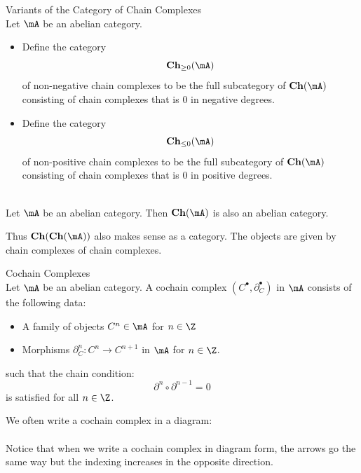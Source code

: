\documentclass[a4paper]{article}
\begin{document}
\begin{defn}{Variants of the Category of Chain Complexes}{}\\
Let $\mA$ be an abelian category. 
\begin{itemize}
\item Define the category $$\bold{Ch}_{\geq 0}(\mA)$$ of non-negative chain complexes to be the full subcategory of $\bold{Ch}(\mA)$ consisting of chain complexes that is $0$ in negative degrees. 
\item Define the category $$\bold{Ch}_{\leq 0}(\mA)$$ of non-positive chain complexes to be the full subcategory of $\bold{Ch}(\mA)$ consisting of chain complexes that is $0$ in positive degrees. 
\end{itemize}
\end{defn}

\begin{prp}{}{}\\
Let $\mA$ be an abelian category. Then $\bold{Ch}(\mA)$ is also an abelian category. 
\end{prp}

Thus $\bold{Ch}(\bold{Ch}(\mA))$ also makes sense as a category. The objects are given by chain complexes of chain complexes. 

\begin{defn}{Cochain Complexes}{}\\
Let $\mA$ be an abelian category. A cochain complex $(C^\bullet,\partial_C^\bullet)$ in $\mA$ consists of the following data: 
\begin{itemize}
\item A family of objects $C^n\in\mA$ for $n\in\Z$
\item Morphisms $\partial_C^n:C^n\to C^{n+1}$ in $\mA$ for $n\in\Z$. 
\end{itemize}
such that the chain condition: $$\partial^n\circ\partial^{n-1}=0$$ is satisfied for all $n\in\Z$. 
\end{defn}

We often write a cochain complex in a diagram: \\
\\
Notice that when we write a cochain complex in diagram form, the arrows go the same way but the indexing increases in the opposite direction. \\
\end{document}
